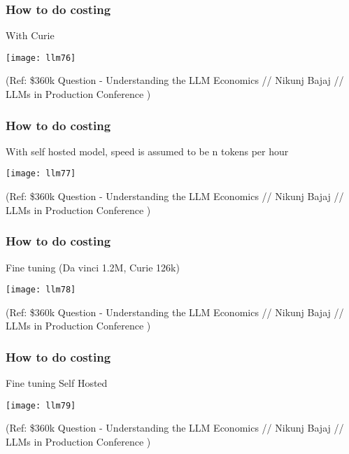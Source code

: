 \begin{frame}[fragile]\frametitle{How to do costing}

With Curie

\begin{center}
\texttt{[image: llm76]}
\end{center}		



{\tiny (Ref: \$360k Question - Understanding the LLM Economics // Nikunj Bajaj // LLMs in Production Conference )}

\end{frame}

\begin{frame}[fragile]\frametitle{How to do costing}

With self hosted model, speed is assumed to be n tokens per hour

\begin{center}
\texttt{[image: llm77]}
\end{center}		



{\tiny (Ref: \$360k Question - Understanding the LLM Economics // Nikunj Bajaj // LLMs in Production Conference )}

\end{frame}

\begin{frame}[fragile]\frametitle{How to do costing}

Fine tuning (Da vinci 1.2M, Curie 126k)
\begin{center}
\texttt{[image: llm78]}
\end{center}		



{\tiny (Ref: \$360k Question - Understanding the LLM Economics // Nikunj Bajaj // LLMs in Production Conference )}

\end{frame}

\begin{frame}[fragile]\frametitle{How to do costing}

Fine tuning Self Hosted
\begin{center}
\texttt{[image: llm79]}
\end{center}		



{\tiny (Ref: \$360k Question - Understanding the LLM Economics // Nikunj Bajaj // LLMs in Production Conference )}

\end{frame}

